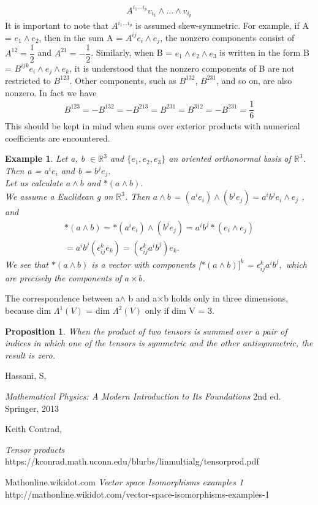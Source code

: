 \documentclass[12pt,a4paper]{article}
\newtheorem{exmp}{Example}[section]
\newtheorem{prop}{Proposition}
\begin{document}
\begin{eqnarray*}
A^{i_1 ... i_p} v_{i_1} \wedge ... \wedge v_{i_p}
\end{eqnarray*}
It is important to note that $A^{i_1 ... i_p}$ is assumed skew-symmetric. For example,
if A = $e_1 \wedge e_2$, then in the sum A = $A^{ij} e_i \wedge e_j$, the nonzero components consist of $A^{12} = \dfrac{1}{2}$ and $A^{21} = -\dfrac{1}{2}$. Similarly, when B = $e_1 \wedge e_2 \wedge e_3$ is written in the form B = $B^{ijk} e_i \wedge e_j \wedge e_k$, it is understood that the nonzero components of B are not restricted to  $B^{123}$. Other components, such as $B^{132}$, $B^{231}$, and so on, are also nonzero. In fact we have\\
\begin{eqnarray*}
B^{123} = -B^{132} = -B^{213} = B^{231} = B^{312} = -B^{231} = \dfrac{1}{6}
\end{eqnarray*}
This should be kept in mind when sums over exterior products with numerical coefficients are encountered.
\begin{exmp}
Let a, b $\in \mathbb{R}^3$ and $\{e_1, e_2, e_3\}$ an oriented orthonormal basis of $\mathbb{R}^3$. Then a = $a^i e_i$ and b = $b^j e_j$.\\
Let us calculate  $a \wedge b$ and $\ast(a \wedge b)$.\\
We assume a Euclidean g on $\mathbb{R}^3$. Then $a \wedge b$ = $( a^i e_i) \wedge (b^j e_j) = a^i b^j e_i \wedge e_j$ , and
\begin{eqnarray*}
\ast (a \wedge b) = \ast (a ^ i e_i) \wedge (b^j e_j) = a^i b^j \ast (e_i \wedge e_j)\\
= a^i b^j ( \epsilon^k_{ij} e_k) = (\epsilon^k_{ij} a^i b^j) e_k.
\end{eqnarray*}
We see that $\ast (a \wedge b)$ is a vector with components [$\ast(a \wedge b)]^k$ = $\epsilon^k_{ij} a^i b^j,$ which are precisely the components of $a \times b$.
\end{exmp}
The correspondence between a$\wedge$ b and a$\times$b holds only in three dimensions, because dim $\Lambda^{1}(V)$ = dim $\Lambda^{2}(V)$ only if dim V = 3.

\begin{prop}
When the product of two tensors is summed over a pair
of indices in which one of the tensors is symmetric and the other antisymmetric, the result is zero.
\end{prop}

\newpage
\begin{thebibliography}{9}

  Hassani, S,

  \emph{Mathematical Physics: A Modern Introduction to Its Foundations}  2nd ed. Springer, 2013
 
  Keith Contrad,

  \emph{Tensor products}  https://kconrad.math.uconn.edu/blurbs/linmultialg/tensorprod.pdf

 Mathonline.wikidot.com
  \emph{Vector space Isomorphisms examples 1} http://mathonline.wikidot.com/vector-space-isomorphisms-examples-1


\end{thebibliography}
\end{document}
